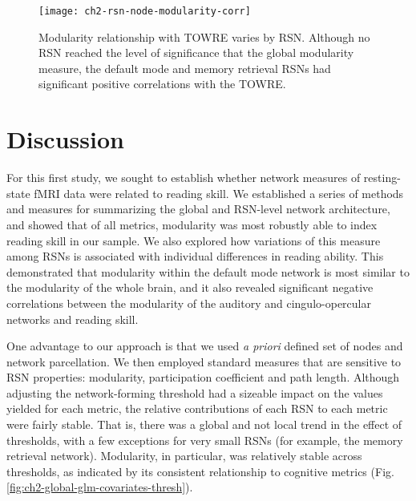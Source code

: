 \begin{itmeize}
\begin{figure}[t]
    \centering
    \texttt{[image: ch2-rsn-node-modularity-corr]}
    \caption[Modularity relationship with TOWRE varies by RSN.] {Modularity relationship with TOWRE varies by RSN. Although no RSN reached the level of significance that the global modularity measure, the default mode and memory retrieval RSNs had significant positive correlations with the TOWRE.}
    \label{fig:ch2-rsn-node-modularity-corr}
\end{figure}

\section{Discussion}

For this first study, we sought to establish whether network measures of resting-state fMRI data were related to reading skill. We established a series of methods and measures for summarizing the global and RSN-level network architecture, and showed that of all metrics, modularity was most robustly able to index reading skill in our sample. We also explored how variations of this measure among RSNs is associated with individual differences in reading ability. This demonstrated that modularity within the default mode network is most similar to the modularity of the whole brain, and it also revealed significant negative correlations between the modularity of the auditory and cingulo-opercular networks and reading skill.

One advantage to our approach is that we used \textit{a priori} defined set of nodes and network parcellation. We then employed standard measures that are sensitive to RSN properties: modularity, participation coefficient and path length. Although adjusting the network-forming threshold had a sizeable impact on the values yielded for each metric, the relative contributions of each RSN to each metric were fairly stable. That is, there was a global and not local trend in the effect of thresholds, with a few exceptions for very small RSNs (for example, the memory retrieval network). Modularity, in particular, was relatively stable across thresholds, as indicated by its consistent relationship to cognitive metrics (Fig. \ref{fig:ch2-global-glm-covariates-thresh}).


\end{itmeize}
